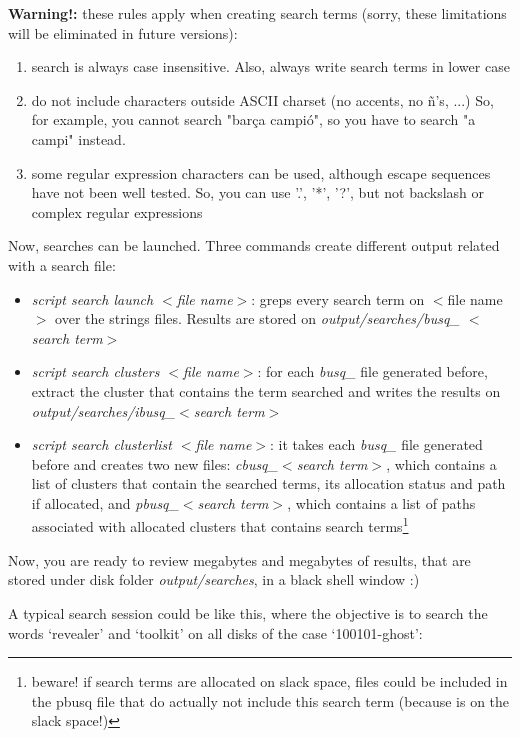 \documentclass[a4paper,11pt,oneside]{report}
\begin{document}
\textbf{Warning!:}  these rules apply when creating search terms (sorry, these limitations will be eliminated in future versions):

\begin{enumerate}
\item search is always case insensitive. Also, always write search terms in lower case
\item do not include characters outside ASCII charset (no accents, no ñ's, ...) So, for example, you cannot search "barça campió", so you have to search "a campi" instead. 
\item some regular expression characters can be used, although escape sequences have not been well tested. So, you can use '.', '*', '?', but not backslash or complex regular expressions 
\end{enumerate}

Now, searches can be launched. Three commands create different output related with a search file:

\begin{itemize}
\item \emph{script search launch $<$file name$>$}:   greps every search term on $<$file name$>$ over the strings files. Results are stored on \emph{output/searches/busq\_ $<$search term$>$}
\item \emph{script search clusters $<$file name$>$}:    for each \emph{busq\_} file generated before, extract the cluster that contains the term searched and writes the results on \emph{output/searches/ibusq\_$<$search term$>$}
\item \emph{script search clusterlist $<$file name$>$}:   it takes each \emph{busq\_} file generated before and creates two new files: \emph{cbusq\_$<$search term$>$}, which contains a list of clusters that contain the searched terms, its allocation status and path if allocated, and  \emph{pbusq\_$<$search term$>$}, which contains a list of paths associated with allocated clusters that contains search terms\footnote{beware! if search terms are allocated on slack space, files could be included in the pbusq file that do actually not include this search term (because is on the slack space!)}
\end{itemize}

Now, you are ready to review megabytes and megabytes of results, that are stored under disk folder \emph{output/searches}, in a black shell window   :)

A typical search session could be like this, where the objective is to search the words `revealer' and `toolkit' on all disks of the case `100101-ghost':
\end{document}

